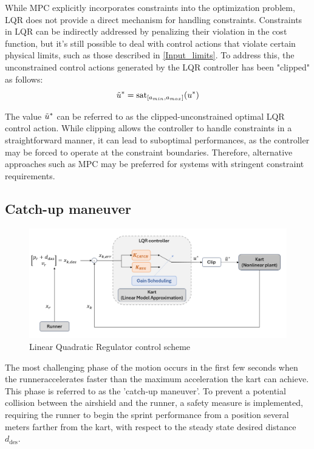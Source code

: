 \documentclass[a4paper,12pt,oneside]{book}
\begin{document}
\bigskip
While MPC explicitly incorporates constraints into the optimization problem, LQR does not provide a direct mechanism for handling constraints.
Constraints in LQR can be indirectly addressed by penalizing their violation in the cost function, but it's still possible to deal with control actions that violate certain physical limits, such as those described in \ref{Input_limits}.
To address this, the unconstrained control actions generated by the LQR controller has been "clipped" as follows:
\begin{equation}
    \Tilde{u}^* = \text{sat}_{[a_{min}, a_{max}]} (u^*)
\end{equation}

The value $\Tilde{u}^*$ can be referred to as the clipped-unconstrained optimal LQR control action.
While clipping allows the controller to handle constraints in a straightforward manner, it can lead to suboptimal performances, as the controller may be forced to operate at the constraint boundaries.
Therefore, alternative approaches such as MPC may be preferred for systems with stringent constraint requirements.

\subsection{Catch-up maneuver}
\begin{figure}
	\centering
	\includegraphics[width=1.0\textwidth]{LQR_sim_scheme.png}
	\caption{Linear Quadratic Regulator control scheme}
	\label{image:LQR_sim_scheme}
\end{figure}

The most challenging phase of the motion occurs in the first few seconds when the runneraccelerates faster than the maximum acceleration the kart can achieve.
This phase is referred to as the 'catch-up maneuver'.
To prevent a potential collision between the airshield and the runner, a safety measure is implemented, requiring the runner to begin the sprint performance from a position several meters farther from the kart, with respect to the steady state desired distance $d_{\text{des}}$.
\end{document}
